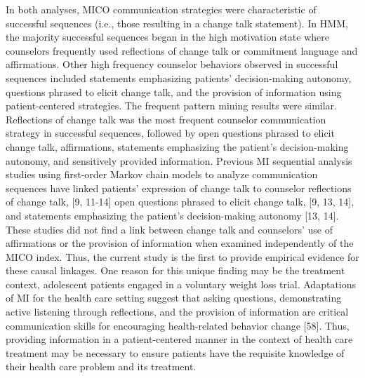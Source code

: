 In both analyses, MICO communication strategies were characteristic of successful sequences (i.e., those resulting in a change talk statement). In HMM, the majority successful sequences began in the high motivation state where counselors frequently used reflections of change talk or commitment language and affirmations. Other high frequency counselor behaviors observed in successful sequences included statements emphasizing patients’ decision-making autonomy, questions phrased to elicit change talk, and the provision of information using patient-centered strategies. The frequent pattern mining results were similar. Reflections of change talk was the most frequent counselor communication strategy in successful sequences, followed by open questions phrased to elicit change talk, affirmations, statements emphasizing the patient’s decision-making autonomy, and sensitively provided information. Previous MI sequential analysis studies using first-order Markov chain models to analyze communication sequences have linked patients’ expression of change talk to counselor reflections of change talk, [9, 11-14] open questions phrased to elicit change talk, [9, 13, 14], and statements emphasizing the patient’s decision-making autonomy [13, 14]. These studies did not find a link between change talk and counselors’ use of affirmations or the provision of information when examined independently of the MICO index. Thus, the current study is the first to provide empirical evidence for these causal linkages. One reason for this unique finding may be the treatment context, adolescent patients engaged in a voluntary weight loss trial. Adaptations of MI for the health care setting suggest that asking questions, demonstrating active listening through reflections, and the provision of information are critical communication skills for encouraging health-related behavior change [58]. Thus, providing information in a patient-centered manner in the context of health care treatment may be necessary to ensure patients have the requisite knowledge of their health care problem and its treatment. 

